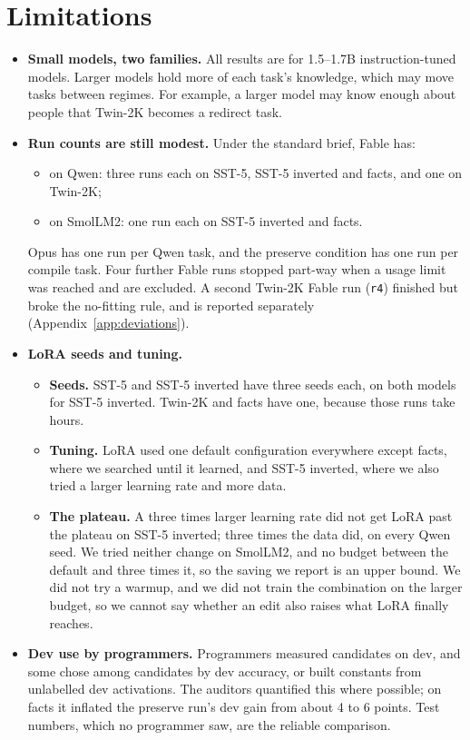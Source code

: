 \section{Limitations}
\label{sec:limitations}

\begin{itemize}
  \item \textbf{Small models, two families.} All results are for 1.5--1.7B instruction-tuned models. Larger models hold more of each task's knowledge, which may move tasks between regimes. For example, a larger model may know enough about people that Twin-2K becomes a redirect task.
  \item \textbf{Run counts are still modest.} Under the standard brief, Fable has:
  \begin{itemize}
    \item on Qwen: three runs each on SST-5, SST-5 inverted and facts, and one on Twin-2K;
    \item on SmolLM2: one run each on SST-5 inverted and facts.
  \end{itemize}
  Opus has one run per Qwen task, and the preserve condition has one run per compile task. Four further Fable runs stopped part-way when a usage limit was reached and are excluded. A second Twin-2K Fable run (\texttt{r4}) finished but broke the no-fitting rule, and is reported separately (Appendix~\ref{app:deviations}).
  \item \textbf{LoRA seeds and tuning.}
  \begin{itemize}
    \item \textbf{Seeds.} SST-5 and SST-5 inverted have three seeds each, on both models for SST-5 inverted. Twin-2K and facts have one, because those runs take hours.
    \item \textbf{Tuning.} LoRA used one default configuration everywhere except facts, where we searched until it learned, and SST-5 inverted, where we also tried a larger learning rate and more data.
    \item \textbf{The plateau.} A three times larger learning rate did not get LoRA past the plateau on SST-5 inverted; three times the data did, on every Qwen seed. We tried neither change on SmolLM2, and no budget between the default and three times it, so the saving we report is an upper bound. We did not try a warmup, and we did not train the combination on the larger budget, so we cannot say whether an edit also raises what LoRA finally reaches.
  \end{itemize}
  \item \textbf{Dev use by programmers.} Programmers measured candidates on dev, and some chose among candidates by dev accuracy, or built constants from unlabelled dev activations. The auditors quantified this where possible; on facts it inflated the preserve run's dev gain from about 4 to 6 points. Test numbers, which no programmer saw, are the reliable comparison.

\end{itemize}
